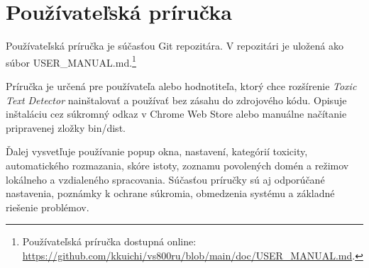 
\chapter{Používateľská príručka}
\label{app:user.manual}

Používateľská príručka je súčasťou Git repozitára. V repozitári je uložená ako súbor \textsf{USER\_MANUAL.md}.\footnote{Používateľská príručka dostupná online: \url{https://github.com/kkuichi/vs800ru/blob/main/doc/USER_MANUAL.md}.}

Príručka je určená pre používateľa alebo hodnotiteľa, ktorý chce rozšírenie \textit{Toxic Text Detector} nainštalovať a používať bez zásahu do zdrojového kódu. Opisuje inštaláciu cez súkromný odkaz v Chrome Web Store alebo manuálne načítanie pripravenej zložky \textsf{bin/dist}.

Ďalej vysvetľuje používanie popup okna, nastavení, kategórií toxicity, automatického rozmazania, skóre istoty, zoznamu povolených domén a režimov lokálneho a vzdialeného spracovania. Súčasťou príručky sú aj odporúčané nastavenia, poznámky k ochrane súkromia, obmedzenia systému a základné riešenie problémov.